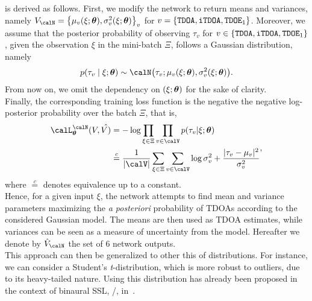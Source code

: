  is derived as follows. First, we modify the network to return means and variances, namely
$V_{\calN} = \set{\muTauv, \sigmaTauv}_v$ for $v = \setTDOA$.
Moreover, we assume that the posterior probability of observing $\tau_v$ for $v \in \setTDOA$, given the observation $\xi$ in the mini-batch $\Xi$, follows a Gaussian distribution, namely
\begin{equation}
    p(\tau_v \mid  \xi ; \params) \sim \calN\kparen{\tau_v; \muTauv, \sigmaTauv}
    .
\end{equation}
From now on, we omit the dependency on $({\xi;\boldsymbol{\theta}})$ for the sake of clarity.
\\Finally, the corresponding training loss function is the negative the negative log-posterior probability over the batch $\Xi$, that is,
\begin{equation}\label{eq:lantern:gausslog}
    \begin{aligned}
        \calL_{\params}^{\calN}(V, \hat{V)}
                    &= - \log \prod_{\xi\in\Xi}\prod_{v\in\calV} p(\tau_v|\xi ; \params) \\
                    &\stackrel{c}{=} \frac{1}{\kvbar{\calV}}
                    \sum_{\xi\in\Xi} \sum_{v\in\calV}
                    \log{\estSigmaTau}
                    + \frac{\powerOf{\tau_v - \estMuTau}}{\estSigmaTau}
    \end{aligned}
    ,
\end{equation}
where $\stackrel{c}{=}$ denotes equivalence up to a constant.
\\Hence, for a given input $\xi$, the network attempts to find mean and variance parameters maximizing the \textit{a posteriori} probability of \acp{TDOA} according to the considered Gaussian model.
The means are then used as \ac{TDOA} estimates, while variances can be seen as a measure of uncertainty from the model.
Hereafter we denote by $\hat{V}_{\calN}$ the set of 6 network outputs.
\\This approach can then be generalized to other this of distributions.
For instance, we can consider a Student's \textit{t}-distribution, which is more robust to outliers, due to its heavy-tailed nature.
Using this distribution has already been proposed in the context of binaural \ac{SSL}, \eg/, in~.

